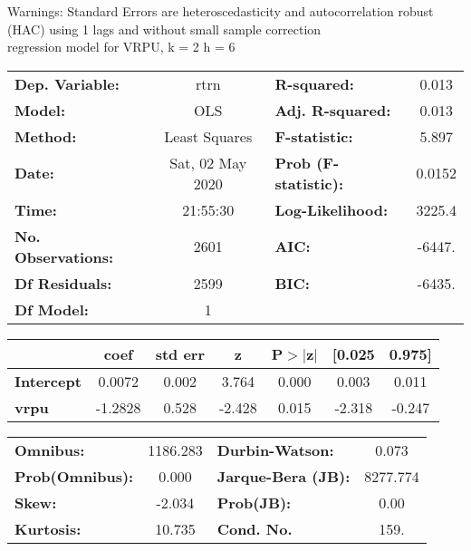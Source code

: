 Warnings: \newline
 [1] Standard Errors are heteroscedasticity and autocorrelation robust (HAC) using 1 lags and without small sample correction\\ 

regression model for VRPU, k = 2 h = 6\begin{center}
\begin{tabular}{lclc}
\toprule
\textbf{Dep. Variable:}    &       rtrn       & \textbf{  R-squared:         } &     0.013   \\
\textbf{Model:}            &       OLS        & \textbf{  Adj. R-squared:    } &     0.013   \\
\textbf{Method:}           &  Least Squares   & \textbf{  F-statistic:       } &     5.897   \\
\textbf{Date:}             & Sat, 02 May 2020 & \textbf{  Prob (F-statistic):} &   0.0152    \\
\textbf{Time:}             &     21:55:30     & \textbf{  Log-Likelihood:    } &    3225.4   \\
\textbf{No. Observations:} &        2601      & \textbf{  AIC:               } &    -6447.   \\
\textbf{Df Residuals:}     &        2599      & \textbf{  BIC:               } &    -6435.   \\
\textbf{Df Model:}         &           1      & \textbf{                     } &             \\
\bottomrule
\end{tabular}
\begin{tabular}{lcccccc}
                   & \textbf{coef} & \textbf{std err} & \textbf{z} & \textbf{P$> |$z$|$} & \textbf{[0.025} & \textbf{0.975]}  \\
\midrule
\textbf{Intercept} &       0.0072  &        0.002     &     3.764  &         0.000        &        0.003    &        0.011     \\
\textbf{vrpu}      &      -1.2828  &        0.528     &    -2.428  &         0.015        &       -2.318    &       -0.247     \\
\bottomrule
\end{tabular}
\begin{tabular}{lclc}
\textbf{Omnibus:}       & 1186.283 & \textbf{  Durbin-Watson:     } &    0.073  \\
\textbf{Prob(Omnibus):} &   0.000  & \textbf{  Jarque-Bera (JB):  } & 8277.774  \\
\textbf{Skew:}          &  -2.034  & \textbf{  Prob(JB):          } &     0.00  \\
\textbf{Kurtosis:}      &  10.735  & \textbf{  Cond. No.          } &     159.  \\
\bottomrule
\end{tabular}
\end{center}

